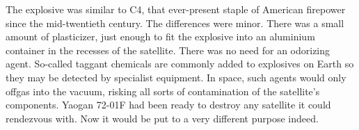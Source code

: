 The explosive was similar to C4, that ever-present staple of American firepower since the mid-twentieth century. The differences were minor. There was a small amount of plasticizer, just enough to fit the explosive into an aluminium container in the recesses of the satellite. There was no need for an odorizing agent. So-called taggant chemicals are commonly added to explosives on Earth so they may be detected by specialist equipment. In space, such agents would only offgas into the vacuum, risking all sorts of contamination of the satellite's components. Yaogan 72-01F had been ready to destroy any satellite it could rendezvous with. Now it would be put to a very different purpose indeed.

\newpage
\thispagestyle{empty}